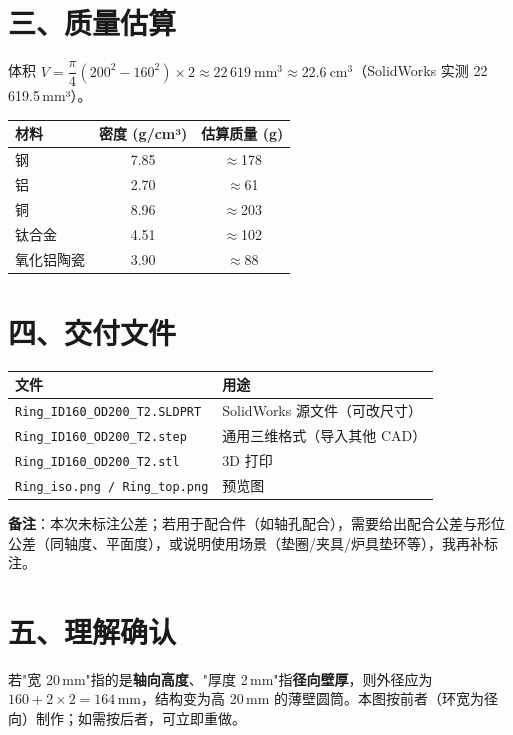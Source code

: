\documentclass[a4paper, 11pt]{ctexart}
\begin{document}
\section*{三、质量估算}
体积 $V=\dfrac{\pi}{4}\left(200^{2}-160^{2}\right)\times 2 \approx 22\,619\ \mathrm{mm^{3}} \approx 22.6\ \mathrm{cm^{3}}$（SolidWorks 实测 22\,619.5\,mm³）。

\begin{center}
\begin{tabular}{lcc}
\toprule
材料 & 密度 (g/cm³) & 估算质量 (g) \\
\midrule
钢 & 7.85 & $\approx$178 \\
铝 & 2.70 & $\approx$61 \\
铜 & 8.96 & $\approx$203 \\
钛合金 & 4.51 & $\approx$102 \\
氧化铝陶瓷 & 3.90 & $\approx$88 \\
\bottomrule
\end{tabular}
\end{center}

\section*{四、交付文件}
\begin{center}
\begin{tabular}{ll}
\toprule
文件 & 用途 \\
\midrule
\texttt{Ring\_ID160\_OD200\_T2.SLDPRT} & SolidWorks 源文件（可改尺寸） \\
\texttt{Ring\_ID160\_OD200\_T2.step} & 通用三维格式（导入其他 CAD） \\
\texttt{Ring\_ID160\_OD200\_T2.stl} & 3D 打印 \\
\texttt{Ring\_iso.png / Ring\_top.png} & 预览图 \\
\bottomrule
\end{tabular}
\end{center}

\noindent\textbf{备注}：本次未标注公差；若用于配合件（如轴孔配合），需要给出配合公差与形位公差（同轴度、平面度），或说明使用场景（垫圈/夹具/炉具垫环等），我再补标注。

\section*{五、理解确认}
若"宽 20\,mm"指的是\textbf{轴向高度}、"厚度 2\,mm"指\textbf{径向壁厚}，则外径应为 $160+2\times2=164$\,mm，结构变为高 20\,mm 的薄壁圆筒。本图按前者（环宽为径向）制作；如需按后者，可立即重做。
\end{document}
